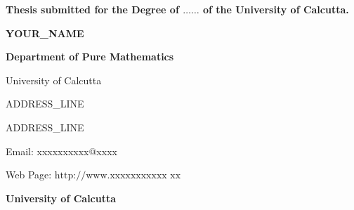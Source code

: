 \documentclass[a4paper,11pt,twoside,chapterprefix=TRUE]{scrbook}
\begin{document}
\begin{titlepage}
\begin{center}



\hrulefill 

\vspace{5mm}

{ \huge \bfseries \fontUbuntu [Title Here: Template for D.Sc, Ph.D, M.Phil Theses of University of Calcutta  ~\\[0.3cm] }

\hrulefill 

\vspace{36mm}

\begin{center}
{\Large \bfseries \fontUbuntu Thesis submitted for the Degree of $\ldots \ldots$ of the University of Calcutta.} 
\end{center}

\vspace{36mm}

\begin{center}
{\huge \bfseries \fontUbuntu YOUR_NAME}

{\large \bfseries \fontUbuntu Department of Pure Mathematics

University of Calcutta

ADDRESS_LINE

ADDRESS_LINE

Email: {xxxxxxxxxx@xxxx}

Web Page: $\text{http://www.xxxxxxxxxxx xx}$ }

\end{center}

\vspace{18mm}

\hrulefill

\vspace{5mm}
{ \Large \bfseries \fontUbuntu University of Calcutta}

\hrulefill




\end{center}
\end{titlepage}
\end{document}
